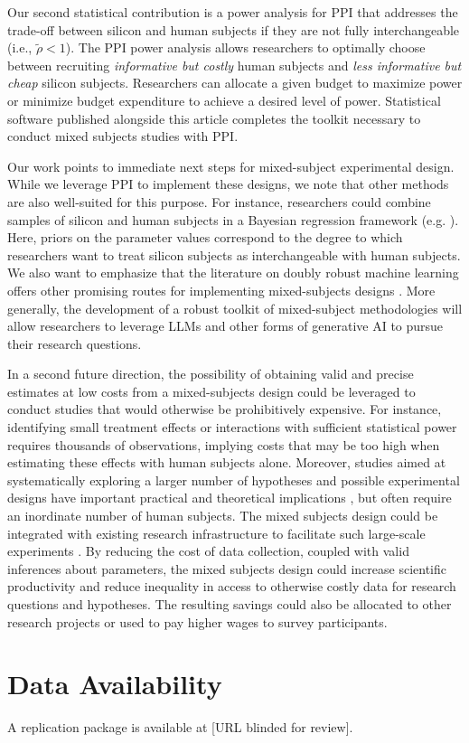 \documentclass{article}
\begin{document}
Our second statistical contribution is a power analysis for PPI that addresses the trade-off between silicon and human subjects if they are not fully interchangeable (i.e., $\tilde{\rho} <1$). The PPI power analysis allows researchers to optimally choose between recruiting \textit{informative but costly} human subjects and \textit{less informative but cheap} silicon subjects. Researchers can allocate a given budget to maximize power or minimize budget expenditure to achieve a desired level of power.  
Statistical software published alongside this article completes the toolkit necessary to conduct mixed subjects studies with PPI.

Our work points to immediate next steps for mixed-subject experimental design. While we leverage PPI to implement these designs, we note that other methods are also well-suited for this purpose. For instance, researchers could combine samples of silicon and human subjects in a Bayesian regression framework (e.g. \citealp{jones2011bayesian}). Here, priors on the parameter values correspond to the degree to which researchers want to treat silicon subjects as interchangeable with human subjects. 
We also want to emphasize that the literature on doubly robust machine learning offers other promising routes for implementing mixed-subjects designs \citep{egami_using_2024-1,kallus_role_2024}. More generally, the development of a robust toolkit of mixed-subject methodologies will allow researchers to leverage LLMs and other forms of generative AI to pursue their research questions.

In a second future direction, the possibility of obtaining valid and precise estimates at low costs from a mixed-subjects design could be leveraged to conduct studies that would otherwise be prohibitively expensive.
For instance, identifying small treatment effects or interactions with sufficient statistical power requires thousands of observations, implying costs that may be too high when estimating these effects with human subjects alone. 
Moreover, studies aimed at systematically exploring a larger number of hypotheses and possible experimental designs have important practical and theoretical implications \citep{almaatooq2024beyond}, but often require an inordinate number of human subjects. The mixed subjects design could be integrated with existing research infrastructure to facilitate such large-scale experiments \citep{almaatouq_empirica_2021}. By reducing the cost of data collection, coupled with valid inferences about parameters, the mixed subjects design could increase scientific productivity and reduce inequality in access to otherwise costly data for research questions and hypotheses. The resulting savings could also be allocated to other research projects or used to pay higher wages to survey participants.

\section*{Data Availability}

A replication package is available at [URL blinded for review].

\newpage
\theendnotes

\newpage



\begin{appendix}


\end{appendix}
\end{document}
